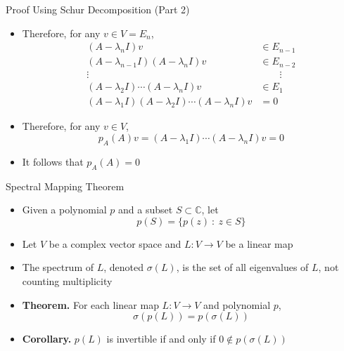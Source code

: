 \documentclass[usenames,dvipsnames,10pt]{beamer}
\newcommand\C{\mathbb{C}}
\begin{document}
\begin{frame}
  {Proof Using Schur Decomposition (Part 2)}

  \begin{itemize}
  \item Therefore, for any $v \in V = E_n$,
    \begin{align*}
      (A-\lambda_n I)v &\in E_{n-1}\\
      (A-\lambda_{n-1}I)(A-\lambda_n I)v &\in E_{n-2}\\
      \vdots &\quad\quad \vdots\\
      (A-\lambda_2I)\cdots(A-\lambda_nI)v &\in E_1\\
      (A-\lambda_1I)(A-\lambda_2I)\cdots(A-\lambda_nI)v &= 0
    \end{align*}
  \item Therefore, for any $v \in V$,
    \[
      p_A(A)v = (A-\lambda_1I)\cdots(A-\lambda_nI)v = 0
    \]
  \item It follows that $p_A(A) = 0$
  \end{itemize}
\end{frame}

\begin{frame}
  {Spectral Mapping Theorem}

  \begin{itemize}
  \item Given a polynomial $p$ and a subset $S \subset \C$, let
    \[ p(S) = \{ p(z)\ :\ z \in S \} \]
  \item Let $V$ be a complex vector space and $L: V \rightarrow V$ be a linear map
  \item The spectrum of $L$, denoted $\sigma(L)$, is the set of all eigenvalues of $L$, not counting multiplicity
  \item {\bf Theorem.} For each linear map $L: V\rightarrow V$ and polynomial $p$,
    \[
      \sigma(p(L)) = p(\sigma(L))
    \]
  \item {\bf Corollary.} $p(L)$ is invertible if and only if $0 \notin p(\sigma(L))$
  \end{itemize}
\end{frame}
\end{document}
